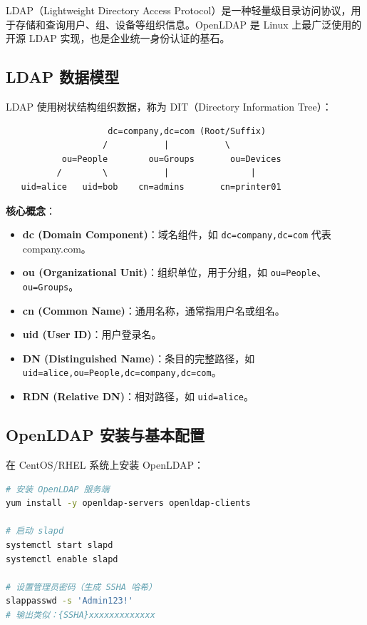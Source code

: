 \documentclass[12pt,UTF8]{ctexbook}
\begin{document}
LDAP（Lightweight Directory Access Protocol）是一种轻量级目录访问协议，用于存储和查询用户、组、设备等组织信息。OpenLDAP 是 Linux 上最广泛使用的开源 LDAP 实现，也是企业统一身份认证的基石。

\subsection{LDAP 数据模型}

LDAP 使用树状结构组织数据，称为 DIT（Directory Information Tree）：

\begin{lstlisting}
                    dc=company,dc=com (Root/Suffix)
                   /           |           \
           ou=People        ou=Groups       ou=Devices
          /        \           |                |
   uid=alice   uid=bob    cn=admins       cn=printer01
\end{lstlisting}

\textbf{核心概念}：

\begin{itemize}
    \item \textbf{dc (Domain Component)}：域名组件，如 \texttt{dc=company,dc=com} 代表 company.com。
    \item \textbf{ou (Organizational Unit)}：组织单位，用于分组，如 \texttt{ou=People}、\texttt{ou=Groups}。
    \item \textbf{cn (Common Name)}：通用名称，通常指用户名或组名。
    \item \textbf{uid (User ID)}：用户登录名。
    \item \textbf{DN (Distinguished Name)}：条目的完整路径，如 \texttt{uid=alice,ou=People,dc=company,dc=com}。
    \item \textbf{RDN (Relative DN)}：相对路径，如 \texttt{uid=alice}。
\end{itemize}

\subsection{OpenLDAP 安装与基本配置}

在 CentOS/RHEL 系统上安装 OpenLDAP：

\begin{lstlisting}[language=bash]
# 安装 OpenLDAP 服务端
yum install -y openldap-servers openldap-clients

# 启动 slapd
systemctl start slapd
systemctl enable slapd

# 设置管理员密码（生成 SSHA 哈希）
slappasswd -s 'Admin123!'
# 输出类似：{SSHA}xxxxxxxxxxxxx
\end{lstlisting}
\end{document}
